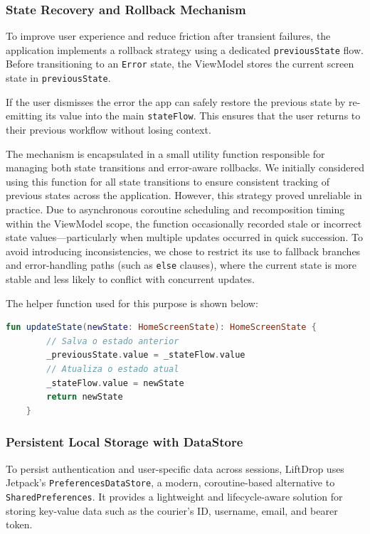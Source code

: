 \newpage

\subsubsection{State Recovery and Rollback Mechanism}

To improve user experience and reduce friction after transient failures, the application implements a rollback strategy using a dedicated \texttt{previousState} flow. Before transitioning to an \texttt{Error} state, the ViewModel stores the current screen state in \texttt{previousState}.

If the user dismisses the error the app can safely restore the previous state by re-emitting its value into the main \texttt{stateFlow}. This ensures that the user returns to their previous workflow without losing context.

The mechanism is encapsulated in a small utility function responsible for managing both state transitions and error-aware rollbacks. We initially considered using this function for all state transitions to ensure consistent tracking of previous states across the application. However, this strategy proved unreliable in practice. Due to asynchronous coroutine scheduling and recomposition timing within the ViewModel scope, the function occasionally recorded stale or incorrect state values—particularly when multiple updates occurred in quick succession. 
To avoid introducing inconsistencies, we chose to restrict its use to fallback branches and error-handling paths (such as \texttt{else} clauses), where the current state is more stable and less likely to conflict with concurrent updates.

The helper function used for this purpose is shown below:

\begin{lstlisting}[language=Kotlin, caption={Safely updating screen state with rollback support}]
fun updateState(newState: HomeScreenState): HomeScreenState {
        // Salva o estado anterior
        _previousState.value = _stateFlow.value
        // Atualiza o estado atual
        _stateFlow.value = newState 
        return newState 
    }
\end{lstlisting}


\subsubsection{Persistent Local Storage with DataStore}

To persist authentication and user-specific data across sessions, LiftDrop uses Jetpack's \texttt{PreferencesDataStore}, a modern, coroutine-based alternative to \texttt{SharedPreferences}. It provides a lightweight and lifecycle-aware solution for storing key-value data such as the courier's ID, username, email, and bearer token.

